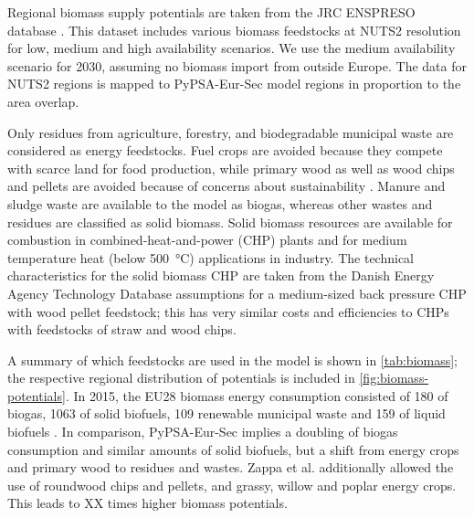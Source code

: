 Regional biomass supply potentials are taken from the JRC ENSPRESO database
. This dataset includes various biomass feedstocks at
NUTS2 resolution for low, medium and high availability scenarios.  We use the
medium availability scenario for 2030, assuming no biomass import from outside
Europe. The data for NUTS2 regions is mapped to PyPSA-Eur-Sec model regions in
proportion to the area overlap.

Only residues from agriculture, forestry, and biodegradable municipal
waste are considered as energy feedstocks. Fuel crops are avoided because they
compete with scarce land for food production, while primary wood as well as wood
chips and pellets are avoided because of concerns about sustainability
.
Manure and sludge waste are available to the model as biogas, whereas other
wastes and residues are classified as solid biomass. Solid biomass resources are
available for combustion in combined-heat-and-power (CHP) plants and for medium
temperature heat (below \SI{500}{\celsius}) applications in industry.
The technical characteristics for the solid biomass CHP are taken from the
Danish Energy Agency Technology Database  assumptions for a
medium-sized back pressure CHP with wood pellet feedstock; this has very similar
costs and efficiencies to CHPs with feedstocks of straw and wood chips.

A summary of which feedstocks are used in the model is shown in
\cref{tab:biomass}; the respective regional distribution of potentials is
included in \cref{fig:biomass-potentials}. In 2015, the EU28 biomass energy
consumption consisted of \SI{180}{\twh} of biogas, \SI{1063}{\twh} of solid
biofuels, \SI{109}{\twh} renewable municipal waste and \SI{159}{\twh} of liquid
biofuels \citeS{}. In comparison, PyPSA-Eur-Sec implies a doubling of biogas
consumption and similar amounts of solid biofuels, but a shift from energy crops
and primary wood to residues and wastes. Zappa et al.
 additionally allowed the use of roundwood chips
and pellets, and grassy, willow and poplar energy crops. This leads to XX times
higher biomass potentials.

